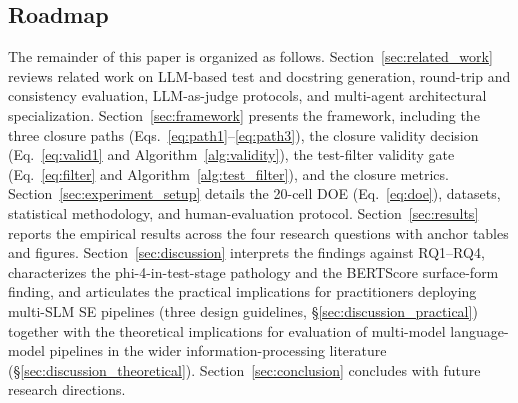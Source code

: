 \subsection{Roadmap}

The remainder of this paper is organized as follows. Section~\ref{sec:related_work} reviews related work on LLM-based test and docstring generation, round-trip and consistency evaluation, LLM-as-judge protocols, and multi-agent architectural specialization. Section~\ref{sec:framework} presents the framework, including the three closure paths (Eqs.~\ref{eq:path1}--\ref{eq:path3}), the closure validity decision (Eq.~\ref{eq:valid1} and Algorithm~\ref{alg:validity}), the test-filter validity gate (Eq.~\ref{eq:filter} and Algorithm~\ref{alg:test_filter}), and the closure metrics. Section~\ref{sec:experiment_setup} details the 20-cell DOE (Eq.~\ref{eq:doe}), datasets, statistical methodology, and human-evaluation protocol. Section~\ref{sec:results} reports the empirical results across the four research questions with anchor tables and figures. Section~\ref{sec:discussion} interprets the findings against RQ1--RQ4, characterizes the phi-4-in-test-stage pathology and the BERTScore surface-form finding, and articulates the practical implications for practitioners deploying multi-SLM SE pipelines (three design guidelines, \S\ref{sec:discussion_practical}) together with the theoretical implications for evaluation of multi-model language-model pipelines in the wider information-processing literature (\S\ref{sec:discussion_theoretical}). Section~\ref{sec:conclusion} concludes with future research directions.

